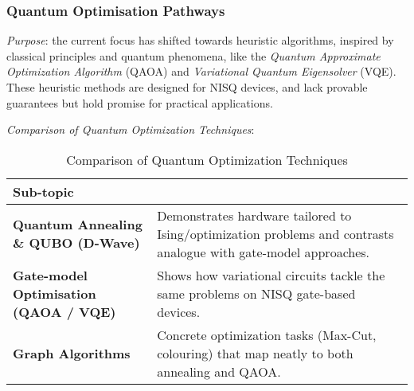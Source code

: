 \subsubsection{Quantum Optimisation Pathways}

\emph{Purpose}: the current focus has shifted towards heuristic algorithms, inspired by classical principles and quantum phenomena, 
like the \emph{Quantum Approximate Optimization Algorithm} (QAOA) and \emph{Variational Quantum Eigensolver} (VQE).
These heuristic methods are designed for NISQ devices, and lack provable guarantees but hold promise for practical applications.
 
\emph{Comparison of Quantum Optimization Techniques}:
\begin{table}[ht]
	\centering
	\begin{tabular}{|p{4cm}p{10.25cm}|}
		\hline
		\textbf{Sub-topic} & \textbf{} \\
		\hline
		\textbf{Quantum Annealing \& QUBO (D-Wave)} & Demonstrates hardware tailored to Ising/optimization problems and contrasts analogue with gate-model approaches. \\
		\hline
		\textbf{Gate-model Optimisation (QAOA / VQE)} & Shows how variational circuits tackle the same problems on NISQ gate-based devices. \\
		\hline
		\textbf{Graph Algorithms} & Concrete optimization tasks (Max-Cut, colouring) that map neatly to both annealing and QAOA. \\
		\hline
	\end{tabular}
	\caption{Comparison of Quantum Optimization Techniques}
\end{table}



